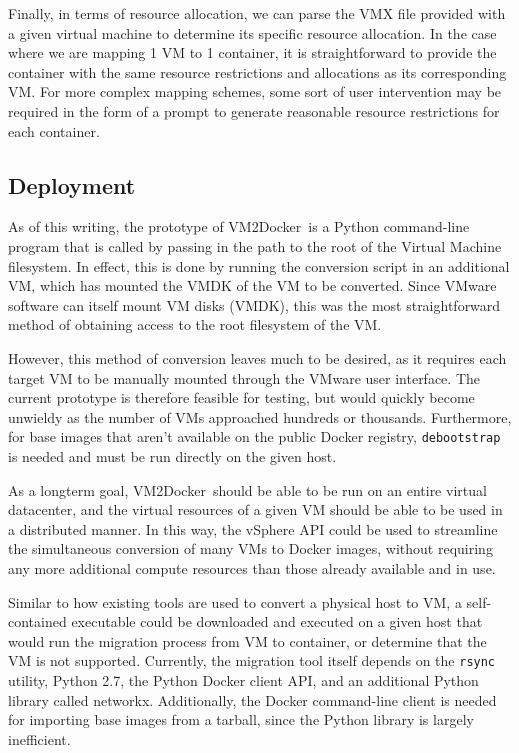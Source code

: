 \documentclass[\myfontsize, letterpaper]{article}
\newcommand{\projectname}{VM2Docker}
\begin{document}
Finally, in terms of resource allocation, we can parse the VMX file provided with a given virtual machine to determine its specific resource allocation. In the case where we are mapping 1 VM to 1 container, it is straightforward to provide the container with the same resource restrictions and allocations as its corresponding VM. For more complex mapping schemes, some sort of user intervention may be required in the form of a prompt to generate reasonable resource restrictions for each container.

\subsection{Deployment}
As of this writing, the prototype of \projectname\ is a Python command-line program that is called by passing in the path to the root of the Virtual Machine filesystem. In effect, this is done by running the conversion script in an additional VM, which has mounted the VMDK of the VM to be converted. Since VMware software can itself mount VM disks (VMDK), this was the most straightforward method of obtaining access to the root filesystem of the VM. 

However, this method of conversion leaves much to be desired, as it requires each target VM to be manually mounted through the VMware user interface. The current prototype is therefore feasible for testing, but would quickly become unwieldy as the number of VMs approached hundreds or thousands. Furthermore, for base images that aren't available on the public Docker registry, \texttt{debootstrap} is needed and must be run directly on the given host.

As a longterm goal, \projectname\ should be able to be run on an entire virtual datacenter, and the virtual resources of a given VM should be able to be used in a distributed manner. In this way, the vSphere API could be used to streamline the simultaneous conversion of many VMs to Docker images, without requiring any more additional compute resources than those already available and in use.

Similar to how existing tools are used to convert a physical host to VM, a self-contained executable could be downloaded and executed on a given host that would run the migration process from VM to container, or determine that the VM is not supported. Currently, the migration tool itself depends on the \texttt{rsync} utility, Python 2.7, the Python Docker client API, and an additional Python library called networkx. Additionally, the Docker command-line client is needed for importing base images from a tarball, since the Python library is largely inefficient.
\end{document}
